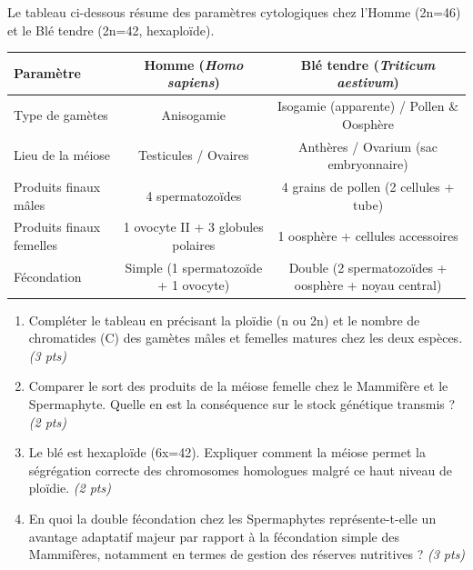 \documentclass[11pt]{article}
\begin{document}
\begin{exercice}
Le tableau ci-dessous résume des paramètres cytologiques chez l'Homme (2n=46) et le Blé tendre (2n=42, hexaploïde).
\begin{center}
\begin{tabular}{|l|c|c|}
\hline
\textbf{Paramètre} & \textbf{Homme (\textit{Homo sapiens})} & \textbf{Blé tendre (\textit{Triticum aestivum})} \\
\hline
Type de gamètes & Anisogamie & Isogamie (apparente) / Pollen \& Oosphère \\
\hline
Lieu de la méiose & Testicules / Ovaires & Anthères / Ovarium (sac embryonnaire) \\
\hline
Produits finaux mâles & 4 spermatozoïdes & 4 grains de pollen (2 cellules + tube) \\
\hline
Produits finaux femelles & 1 ovocyte II + 3 globules polaires & 1 oosphère + cellules accessoires \\
\hline
Fécondation & Simple (1 spermatozoïde + 1 ovocyte) & Double (2 spermatozoïdes + oosphère + noyau central) \\
\hline
\end{tabular}
\end{center}
\begin{enumerate}
    \item Compléter le tableau en précisant la ploïdie (n ou 2n) et le nombre de chromatides (C) des gamètes mâles et femelles matures chez les deux espèces. \textit{(3 pts)}
    \item Comparer le sort des produits de la méiose femelle chez le Mammifère et le Spermaphyte. Quelle en est la conséquence sur le stock génétique transmis ? \textit{(2 pts)}
    \item Le blé est hexaploïde (6x=42). Expliquer comment la méiose permet la ségrégation correcte des chromosomes homologues malgré ce haut niveau de ploïdie. \textit{(2 pts)}
    \item En quoi la double fécondation chez les Spermaphytes représente-t-elle un avantage adaptatif majeur par rapport à la fécondation simple des Mammifères, notamment en termes de gestion des réserves nutritives ? \textit{(3 pts)}
\end{enumerate}
\end{exercice}
\end{document}
